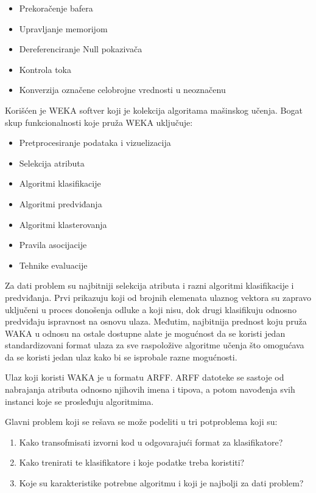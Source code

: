 \documentclass[a4paper]{article}
\theoremstyle{definition}
\begin{document}
{\begin{itemize}
\item Prekoračenje bafera

\item Upravljanje memorijom

\item Dereferenciranje Null pokazivača

\item Kontrola toka

\item Konverzija označene celobrojne vrednosti u neoznačenu
\end{itemize}


Korišćen je WEKA softver koji je kolekcija algoritama mašinskog učenja.
Bogat skup funkcionalnosti koje pruža WEKA uključuje:
\begin{itemize}
\item Pretprocesiranje podataka i vizuelizacija
\item Selekcija atributa
\item Algoritmi klasifikacije
\item Algoritmi predviđanja
\item Algoritmi klasterovanja
\item Pravila asocijacije
\item Tehnike evaluacije
\end{itemize}


Za dati problem su najbitniji selekcija atributa i razni algoritmi klasifikacije i predviđanja.
Prvi prikazuju koji od brojnih elemenata ulaznog vektora su zapravo uključeni u proces donošenja odluke a koji nisu, dok
drugi klasifikuju odnosno predviđaju ispravnost na osnovu ulaza.
Međutim, najbitnija prednost koju pruža WAKA u odnosu na ostale dostupne alate je mogućnost da se koristi
jedan standardizovani format ulaza za sve raspoložive algoritme učenja što omogućava da se koristi jedan ulaz kako bi se isprobale
razne mogućnosti.

Ulaz koji koristi WAKA je u formatu ARFF.
ARFF datoteke se sastoje od nabrajanja atributa odnosno njihovih imena i tipova, a potom navođenja svih instanci koje se prosleđuju algoritmima.

Glavni problem koji se rešava se može podeliti u tri potproblema koji su:
\begin{enumerate}
\item Kako transofmisati izvorni kod u odgovarajući format za klasifikatore?
\item Kako trenirati te klasifikatore i koje podatke treba koristiti?
\item Koje su karakteristike potrebne algoritmu i koji je najbolji za dati problem?
\end{enumerate}



}
\end{document}
